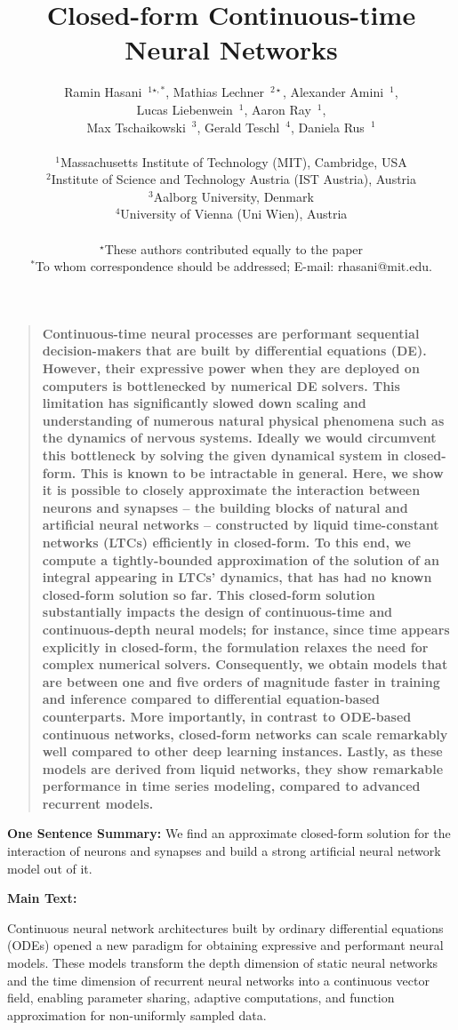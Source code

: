 \documentclass[12pt]{article}
\title{Closed-form Continuous-time Neural Networks}
\author
{Ramin Hasani~$^{1\star,*}$, Mathias Lechner~$^{2\star}$, Alexander Amini~$^1$,\\ Lucas Liebenwein~$^1$, Aaron Ray~$^1$, \\
Max Tschaikowski~$^3$, Gerald Teschl~$^4$, Daniela Rus~$^1$\\
\\
\normalsize{$^{1}$Massachusetts Institute of Technology (MIT), Cambridge, USA}\\
\normalsize{$^{2}$Institute of Science and Technology Austria (IST Austria), Austria}\\
\normalsize{$^{3}$Aalborg University, Denmark}\\
\normalsize{$^{4}$University of Vienna (Uni Wien), Austria}\\
\\
\normalsize{$^{\star}$These authors contributed equally to the paper}\\
\normalsize{$^*$To whom correspondence should be addressed; E-mail:  rhasani@mit.edu.}
}
\date{}
\newenvironment{sciabstract}{\begin{quote} \bf}
{\end{quote}}
\begin{document}
 



\baselineskip24pt



\maketitle 


\begin{sciabstract}
Continuous-time neural processes are performant sequential decision-makers that are built by differential equations (DE). However, their expressive power when they are deployed on computers is bottlenecked by numerical DE solvers. This limitation has significantly slowed down scaling and understanding of numerous natural physical phenomena such as the dynamics of nervous systems. Ideally we would circumvent this bottleneck by solving the given dynamical system in closed-form. This is known to be intractable in general. Here, we show it is possible to closely approximate the interaction between neurons and synapses -- the building blocks of natural and artificial neural networks -- constructed by liquid time-constant networks (LTCs) \cite{hasani2021liquid} efficiently in closed-form. 
To this end, we compute a tightly-bounded approximation of the solution of an integral appearing in LTCs' dynamics, that has had no known closed-form solution so far. This closed-form solution substantially impacts the design of continuous-time and continuous-depth neural models; for instance, since time appears explicitly in closed-form, the formulation relaxes the need for complex numerical solvers. Consequently, we obtain models that are between one and five orders of magnitude faster in training and inference compared to differential equation-based counterparts. More importantly, in contrast to ODE-based continuous networks, closed-form networks can scale remarkably well compared to other deep learning instances. Lastly, as these models are derived from liquid networks, they show remarkable performance in time series modeling, compared to advanced recurrent models.
\end{sciabstract}

\noindent \textbf{One Sentence Summary:} We find an approximate closed-form solution for the interaction of neurons and synapses and build a strong artificial neural network model out of it.

\noindent \textbf{Main Text:}

\noindent Continuous neural network architectures built by ordinary differential equations (ODEs) \cite{chen2018neural} opened a new paradigm for obtaining expressive and performant neural models. These models transform the depth dimension of static neural networks and the time dimension of recurrent neural networks into a continuous vector field, enabling parameter sharing, adaptive computations, and function approximation for non-uniformly sampled data.
\end{document}
